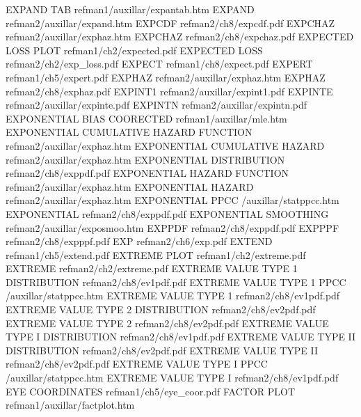 EXPAND TAB                              refman1/auxillar/expantab.htm
EXPAND                                  refman2/auxillar/expand.htm
EXPCDF                                  refman2/ch8/expcdf.pdf
EXPCHAZ                                 refman2/auxillar/exphaz.htm
EXPCHAZ                                 refman2/ch8/expchaz.pdf
EXPECTED LOSS PLOT                      refman1/ch2/expected.pdf
EXPECTED LOSS                           refman2/ch2/exp_loss.pdf
EXPECT                                  refman1/ch8/expect.pdf
EXPERT                                  refman1/ch5/expert.pdf
EXPHAZ                                  refman2/auxillar/exphaz.htm
EXPHAZ                                  refman2/ch8/exphaz.pdf
EXPINT1                                 refman2/auxillar/expint1.pdf
EXPINTE                                 refman2/auxillar/expinte.pdf
EXPINTN                                 refman2/auxillar/expintn.pdf
EXPONENTIAL BIAS COORECTED              refman1/auxillar/mle.htm
EXPONENTIAL CUMULATIVE HAZARD FUNCTION  refman2/auxillar/exphaz.htm
EXPONENTIAL CUMULATIVE HAZARD           refman2/auxillar/exphaz.htm
EXPONENTIAL DISTRIBUTION                refman2/ch8/exppdf.pdf
EXPONENTIAL HAZARD FUNCTION             refman2/auxillar/exphaz.htm
EXPONENTIAL HAZARD                      refman2/auxillar/exphaz.htm
EXPONENTIAL PPCC                        /auxillar/statppcc.htm
EXPONENTIAL                             refman2/ch8/exppdf.pdf
EXPONENTIAL SMOOTHING                   refman2/auxillar/exposmoo.htm
EXPPDF                                  refman2/ch8/exppdf.pdf
EXPPPF                                  refman2/ch8/expppf.pdf
EXP                                     refman2/ch6/exp.pdf
EXTEND                                  refman1/ch5/extend.pdf
EXTREME PLOT                            refman1/ch2/extreme.pdf
EXTREME                                 refman2/ch2/extreme.pdf
EXTREME VALUE TYPE 1 DISTRIBUTION       refman2/ch8/ev1pdf.pdf
EXTREME VALUE TYPE 1 PPCC               /auxillar/statppcc.htm
EXTREME VALUE TYPE 1                    refman2/ch8/ev1pdf.pdf
EXTREME VALUE TYPE 2 DISTRIBUTION       refman2/ch8/ev2pdf.pdf
EXTREME VALUE TYPE 2                    refman2/ch8/ev2pdf.pdf
EXTREME VALUE TYPE I DISTRIBUTION       refman2/ch8/ev1pdf.pdf
EXTREME VALUE TYPE II DISTRIBUTION      refman2/ch8/ev2pdf.pdf
EXTREME VALUE TYPE II                   refman2/ch8/ev2pdf.pdf
EXTREME VALUE TYPE I PPCC               /auxillar/statppcc.htm
EXTREME VALUE TYPE I                    refman2/ch8/ev1pdf.pdf
EYE COORDINATES                         refman1/ch5/eye_coor.pdf
FACTOR PLOT                             refman1/auxillar/factplot.htm

